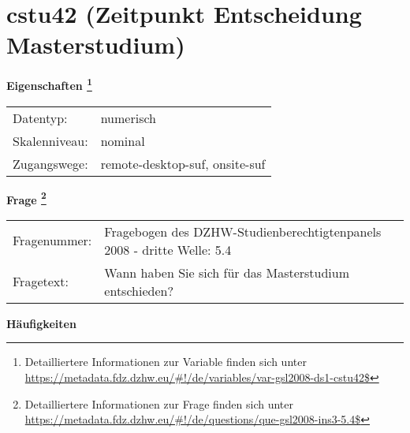 
    \setcounter{footnote}{0}

    \vspace*{-1.8cm}
	\section{cstu42 (Zeitpunkt Entscheidung Masterstudium)}
	\label{section:cstu42}



    \vspace*{0.5cm}
    \noindent\textbf{Eigenschaften
	\footnote{Detailliertere Informationen zur Variable finden sich unter
		\url{https://metadata.fdz.dzhw.eu/\#!/de/variables/var-gsl2008-ds1-cstu42$}}}\\
	\begin{tabularx}{\hsize}{@{}lX}
	Datentyp: & numerisch \\
	Skalenniveau: & nominal \\
	Zugangswege: &
	  remote-desktop-suf, 
	  onsite-suf
 \\
    \end{tabularx}



				\vspace*{0.5cm}
                \noindent\textbf{Frage
	                \footnote{Detailliertere Informationen zur Frage finden sich unter
		              \url{https://metadata.fdz.dzhw.eu/\#!/de/questions/que-gsl2008-ins3-5.4$}}}\\
				\begin{tabularx}{\hsize}{@{}lX}
					Fragenummer: &
					  Fragebogen des DZHW-Studienberechtigtenpanels 2008 - dritte Welle:
					  5.4
 \\
					Fragetext: & Wann haben Sie sich für das Masterstudium entschieden? \\
				\end{tabularx}





        		\vspace*{0.5cm}
                \noindent\textbf{Häufigkeiten}

